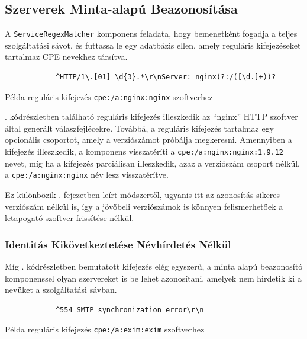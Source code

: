 \documentclass[a4paper,12pt]{article}
\begin{document}
\subsection{Szerverek Minta-alapú Beazonosítása} \label{ssec:patternmatch}

	A \texttt{ServiceRegexMatcher} komponens feladata, hogy bemenetként fogadja a teljes szolgáltatási sávot, és futtassa le egy adatbázis ellen, amely reguláris kifejezéseket tartalmaz CPE nevekhez társítva.

	\begin{listing}[H]
		\begin{verbatim}
			^HTTP/1\.[01] \d{3}.*\r\nServer: nginx(?:/([\d.]+))?
		\end{verbatim}
		\caption{Példa reguláris kifejezés \texttt{cpe:/a:nginx:nginx} szoftverhez}
		\label{nginxregex}
	\end{listing}
	
	\Az{\ref{nginxregex}}. kódrészletben található reguláris kifejezés illeszkedik az ``nginx'' HTTP szoftver által generált válaszfejlécekre. Továbbá, a reguláris kifejezés tartalmaz egy opcionális csoportot, amely a verziószámot próbálja megkeresni. Amennyiben a kifejezés illeszkedik, a komponens visszatéríti a \texttt{cpe:/a:nginx:nginx:1.9.12} nevet, míg ha a kifejezés parciálisan illeszkedik, azaz a verziószám csoport nélkül, a \texttt{cpe:/a:nginx:nginx} név lesz visszatérítve.
	
	Ez különbözik \az{\ref{ssec:matchcpe}}. fejezetben leírt módszertől, ugyanis itt az azonosítás sikeres verziószám nélkül is, így a jövőbeli verziószámok is könnyen felismerhetőek a letapogató szoftver frissítése nélkül.
	
\subsubsection{Identitás Kikövetkeztetése Névhírdetés Nélkül}
	
	Míg \az{\ref{nginxregex}}. kódrészletben bemutatott kifejezés elég egyszerű, a minta alapú beazonosító komponenssel olyan szervereket is be lehet azonosítani, amelyek nem hirdetik ki a nevüket a szolgáltatási sávban.
	
	\begin{listing}[H]
		\begin{verbatim}
			^554 SMTP synchronization error\r\n
		\end{verbatim}
		\caption{Példa reguláris kifejezés \texttt{cpe:/a:exim:exim} szoftverhez}
		\label{eximregex}
	\end{listing}
	
\end{document}
